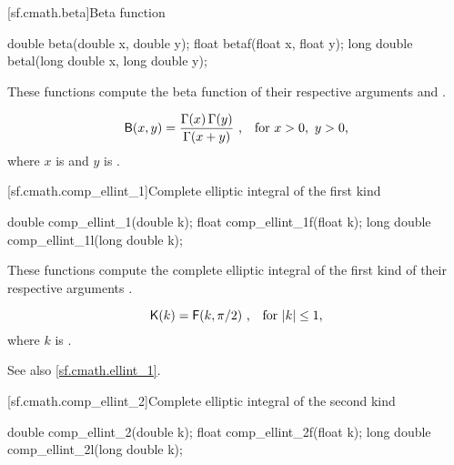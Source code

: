 [sf.cmath.beta]{Beta function}%
%
%
%
%
%
\begin{itemdecl}
double       beta(double x, double y);
float        betaf(float x, float y);
long double  betal(long double x, long double y);
\end{itemdecl}

\begin{itemdescr}
\pnum
\effects
These functions compute
the beta function
of their respective arguments
 and .

\pnum
\returns
\[ \mathsf{B}(x, y) = \frac{\Gamma(x) \, \Gamma(y)}{\Gamma(x + y)}
   \text{ ,\quad for $x > 0$,\, $y > 0$,} \]
where
$x$ is  and
$y$ is .
\end{itemdescr}

[sf.cmath.comp_ellint_1]{Complete elliptic integral of the first kind}%
%
%
%
%
%
\begin{itemdecl}
double       comp_ellint_1(double k);
float        comp_ellint_1f(float k);
long double  comp_ellint_1l(long double k);
\end{itemdecl}

\begin{itemdescr}
\pnum
\effects
These functions compute
the complete elliptic integral of the first kind
of their respective arguments
.

\pnum
\returns
\[ \mathsf{K}(k) = \mathsf{F}(k, \pi / 2) \text{ ,\quad for $|k| \le 1$,} \]
where
$k$ is .

\pnum
See also \ref{sf.cmath.ellint_1}.
\end{itemdescr}

[sf.cmath.comp_ellint_2]{Complete elliptic integral of the second kind}%
%
%
%
%
%
\begin{itemdecl}
double       comp_ellint_2(double k);
float        comp_ellint_2f(float k);
long double  comp_ellint_2l(long double k);
\end{itemdecl}

